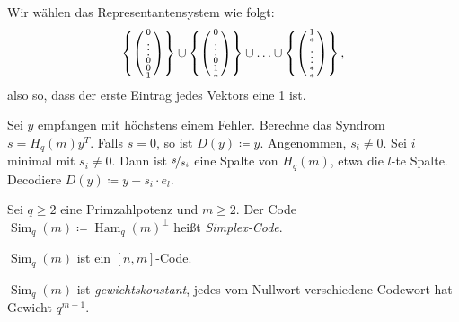 \documentclass{cheat-sheet}
\DeclareMathOperator{\Ham}{Ham} %
\DeclareMathOperator{\Sim}{Sim} %
\begin{document}
\begin{bem}
  Wir wählen das Representantensystem wie folgt:
  \[
    \left\{ \begin{psmallmatrix} 0 \\ \vdots \\ 0 \\ 0 \\ 1 \end{psmallmatrix} \right\} \cup
    \left\{ \begin{psmallmatrix} 0 \\ \vdots \\ 0 \\ 1 \\ * \end{psmallmatrix} \right\} \cup \ldots \cup
    \left\{ \begin{psmallmatrix} 1 \\ * \\ \vdots \\ * \\ * \end{psmallmatrix} \right\},
  \]
  also so, dass der erste Eintrag jedes Vektors eine 1 ist.
\end{bem}

\begin{alg}
  Sei $y$ empfangen mit höchstens einem Fehler.
  Berechne das Syndrom $s = H_q(m)y^T$.
  Falls $s = 0$, so ist $D(y) \coloneqq y$.
  Angenommen, $s_i \neq 0$.
  Sei $i$ minimal mit $s_i \neq 0$.
  Dann ist $\nicefrac{s}{s_i}$ eine Spalte von $H_q(m)$, etwa die $l$-te Spalte.
  Decodiere $D(y) \coloneqq y - s_i \cdot e_l$.
\end{alg}


\begin{defn}
  Sei $q \geq 2$ eine Primzahlpotenz und $m \geq 2$.
  Der Code $\Sim_q(m) \coloneqq \Ham_q(m)^\perp$ heißt \emph{Simplex-Code}.
\end{defn}

\begin{bem}
  $\Sim_q(m)$ ist ein $[n, m]$-Code.
\end{bem}

\begin{satz}
  $\Sim_q(m)$ ist \emph{gewichtskonstant}, \dh{} jedes vom Nullwort verschiedene Codewort hat Gewicht $q^{m-1}$.
\end{satz}
\end{document}
